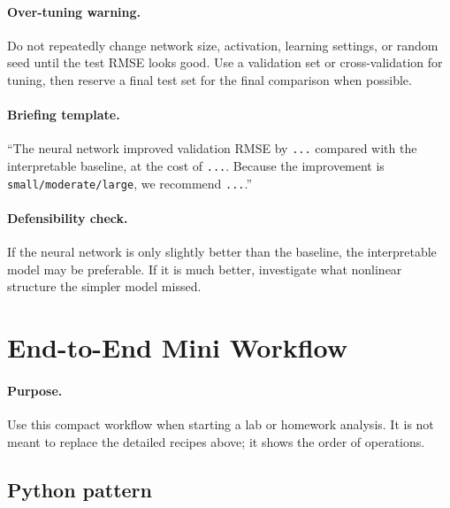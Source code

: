 \paragraph{Over-tuning warning.} Do not repeatedly change network size, activation, learning settings, or random seed until the test RMSE looks good.  Use a validation set or cross-validation for tuning, then reserve a final test set for the final comparison when possible.

\paragraph{Briefing template.} ``The neural network improved validation RMSE by \texttt{...} compared with the interpretable baseline, at the cost of \texttt{...}.  Because the improvement is \texttt{small/moderate/large}, we recommend \texttt{...}.''

\paragraph{Defensibility check.} If the neural network is only slightly better than the baseline, the interpretable model may be preferable.  If it is much better, investigate what nonlinear structure the simpler model missed.


\section{End-to-End Mini Workflow}
\label{app:cookbook-end-to-end-mini-workflow}

\paragraph{Purpose.} Use this compact workflow when starting a lab or homework analysis.  It is not meant to replace the detailed recipes above; it shows the order of operations.

\subsection*{Python pattern}

